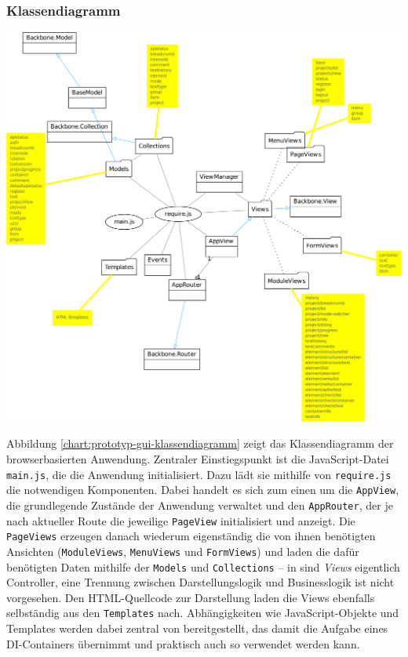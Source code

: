 \subsubsection{Klassendiagramm}

\begin{center}
\includegraphics[width=\textwidth]{media/prototyp-gui-klassendiagramm.pdf}
\label{chart:prototyp-gui-klassendiagramm}
\end{center}

Abbildung \ref{chart:prototyp-gui-klassendiagramm} zeigt das Klassendiagramm der browserbasierten Anwendung. Zentraler Einstiegspunkt ist die JavaScript-Datei \texttt{main.js}, die die Anwendung initialisiert. Dazu lädt sie mithilfe von \texttt{require.js} die notwendigen Komponenten. Dabei handelt es sich zum einen um die \texttt{AppView}, die grundlegende Zustände der Anwendung verwaltet und den \texttt{AppRouter}, der je nach aktueller Route die jeweilige \texttt{PageView} initialisiert und anzeigt. Die \texttt{PageViews} erzeugen danach wiederum eigenständig die von ihnen benötigten Ansichten (\texttt{ModuleViews}, \texttt{MenuViews} und \texttt{FormViews}) und laden die dafür benötigten Daten mithilfe der \texttt{Models} und \texttt{Collections} -- in  sind \emph{Views} eigentlich Controller, eine Trennung zwischen Darstellungslogik und Businesslogik ist nicht vorgesehen. Den HTML-Quellcode zur Darstellung laden die Views ebenfalls selbständig aus den \texttt{Templates} nach. Abhängigkeiten wie JavaScript-Objekte und Templates werden dabei zentral von  bereitgestellt, das damit die Aufgabe eines DI-Containers übernimmt und praktisch auch so verwendet werden kann.

